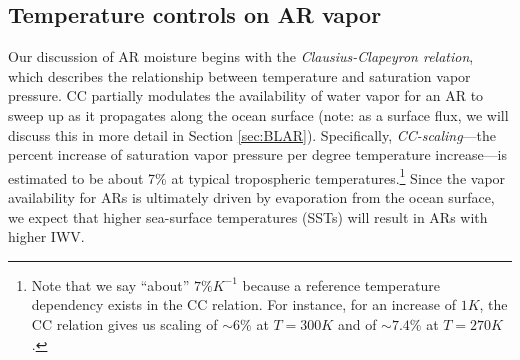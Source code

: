 \documentclass[letterpaper,12pt]{article}
\begin{document}

\subsection{Temperature controls on AR vapor}

Our discussion of AR moisture begins with the \textit{Clausius-Clapeyron relation}, which describes the relationship between temperature and saturation vapor pressure. CC partially modulates the availability of water vapor for an AR to sweep up as it propagates along the ocean surface (note: as a surface flux, we will discuss this in more detail in Section \ref{sec:BLAR}). Specifically, \textit{CC-scaling}---the percent increase of saturation vapor pressure per degree temperature increase---is estimated to be about 7\% at typical tropospheric temperatures.\footnote{Note that we say ``about'' $7\%K^{-1}$ because a reference temperature dependency exists in the CC relation. For instance, for an increase of $1K$, the CC relation gives us scaling of $\sim 6\%$ at $T=300K$ and of $\sim 7.4\%$ at $T=270K$.} Since the vapor availability for ARs is ultimately driven by evaporation from the ocean surface, we expect that higher sea-surface temperatures (SSTs) will result in ARs with higher IWV. 
\end{document}
